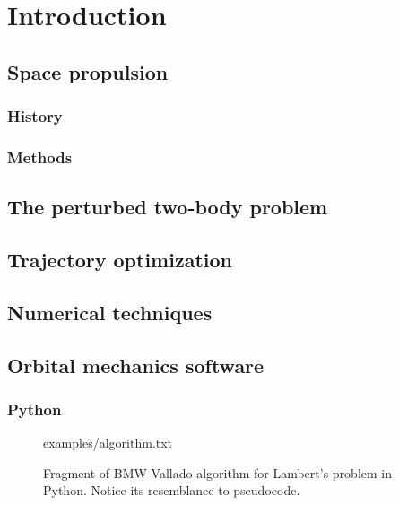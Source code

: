 \section{Introduction} \label{introduction}

\subsection{Space propulsion}

\subsubsection{History}

\subsubsection{Methods}

\subsection{The perturbed two-body problem}

\subsection{Trajectory optimization}

\subsection{Numerical techniques}

\subsection{Orbital mechanics software}

\subsubsection{Python} \label{sec:python}

\begin{figure}
\begin{lstinputlisting}[language=Python]{examples/algorithm.txt}
\end{lstinputlisting}
\caption{Fragment of BMW-Vallado algorithm for Lambert's problem in Python. Notice its resemblance to pseudocode.}
\label{fig:python}
\end{figure}

